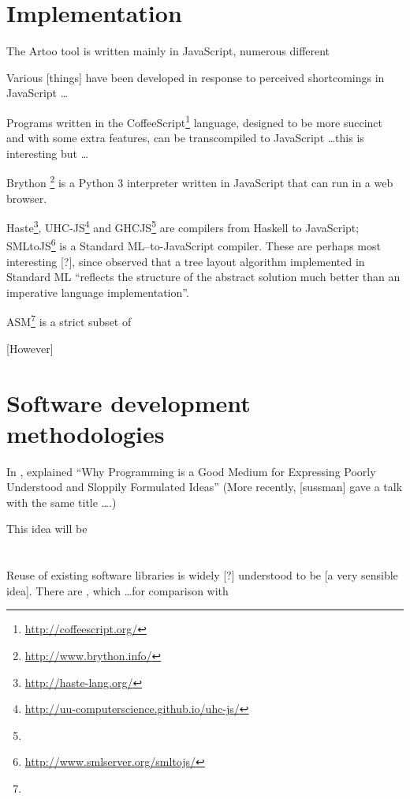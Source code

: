 \section{Implementation}



The Artoo tool is written mainly in JavaScript, numerous different 

Various [things] have been developed in response to perceived shortcomings in JavaScript \ldots

Programs written in the CoffeeScript\footnote{\url{http://coffeescript.org/}} language, designed to be more succinct and with some extra features, can be transcompiled to JavaScript \ldots this is interesting but \ldots

Brython \footnote{\url{http://www.brython.info/}} is a Python 3 interpreter written in JavaScript that can run in a web browser. 

Haste\footnote{\url{http://haste-lang.org/}}, UHC-JS\footnote{\url{http://uu-computerscience.github.io/uhc-js/}} and GHCJS\footnote{} are compilers from Haskell to JavaScript; SMLtoJS\footnote{\url{http://www.smlserver.org/smltojs/}} is a Standard ML--to-JavaScript compiler. These are perhaps most interesting [?], since \citet{kennedyfuntrees} observed that a tree layout algorithm implemented in Standard ML ``reflects the structure of the abstract solution much better than an imperative language implementation''.



ASM\footnote{} is a strict subset of 

[However]


\section{Software development methodologies}

In \citeyear{67poorslop}, \citet*{67poorslop} explained ``Why Programming is a Good Medium for Expressing Poorly Understood and Sloppily Formulated Ideas''
(More recently, [sussman] gave a talk with the same title \ldots {}.)

This idea will be 

\section{}

Reuse of existing software libraries is widely [?] understood to be [a very sensible idea]. There are , which \ldots for comparison with 

